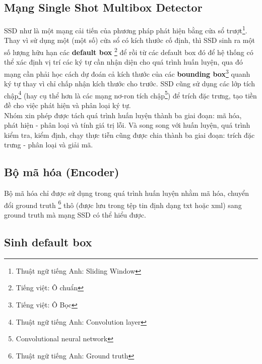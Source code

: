 \documentclass[a4paper]{article}
\theoremstyle{definition}
\begin{document}
	\subsection*{Mạng Single Shot Multibox Detector\cite{liu2016ssd}}
	SSD\cite{liu2016ssd} như là một mạng cải tiến của phương pháp phát hiện bằng cửa sổ trượt\footnote{Thuật ngữ tiếng Anh: Sliding Window}. Thay vì sử dụng một (một số) cửa sổ có kích thước cố định, thì SSD sinh ra một số lượng hữu hạn các \textbf{default box} \footnote{Tiếng việt: Ô chuẩn} để rồi từ các default box đó để hệ thống có thể xác định vị trí các ký tự cần nhận diện cho quá trình huấn luyện, qua đó mạng cần phải học cách dự đoán cả kích thước của các \textbf{bounding box}\footnote{Tiếng việt: Ô Bọc} quanh ký tự thay vì chỉ chấp nhận kích thước cho trước. SSD\cite{liu2016ssd} cũng sử dụng các lớp tích chập\footnote{Thuật ngữ tiếng Anh: Convolution layer} (hay cụ thể hơn là các mạng nơ-ron tích chập\footnote{Convolutional neural network}) để trích đặc trưng, tạo tiền đề cho việc phát hiện và phân loại ký tự. \\
	Nhóm xin phép được tách quá trình huấn luyện thành ba giai đoạn: mã hóa, phát hiện - phân loại và tính giá trị lỗi. Và song song với huấn luyện, quá trình kiểm tra, kiểm định, chạy thực tiễn cũng được chia thành ba giai đoạn: trích đặc trưng - phân loại và giải mã.
	
	\subsection{Bộ mã hóa (Encoder)}
	Bộ mã hóa chỉ được sử dụng trong quá trình huấn luyện nhằm mã hóa, chuyển đổi ground truth \footnote{Thuật ngữ tiếng Anh: Ground truth} thô (được lưu trong tệp tin định dạng txt hoặc xml) sang ground truth mà mạng SSD\cite{liu2016ssd} có thể hiểu được.
	
	\subsection*{Sinh default box}
	
\end{document}
